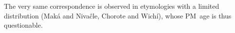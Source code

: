 \begin{exe}
    \ex \honeycomb
    \ex \plaj
    \ex \lick
    \ex \fallonitsown
    \ex \mouth
    \ex \fruit
    \ex \bite
    \ex \companion
    \ex \rightn \label{a-rightn}
    \ex \coal \label{a-coal}
    \ex \disease
    \ex \firef
    \ex \centipede
    \ex \cutdown
    \ex \algarrobof
    \ex \north
    \ex \elbow
    \ex \suncho
    \ex \breath
    \ex \dew \label{a-dew}
    \ex \tooln
    \ex \grove
    \ex \redquebracho \label{a-redquebracho}
    \ex \neighbor
    \ex \elderbro
    \ex \eldersis
    \ex \sunn
    \ex \armadillo \label{a-armadillo}
    \ex \spouse
    \ex \barnowl
    \ex \thorncutjan
    \ex \oldn
    \ex \iscayante \label{a-iscayante}
    \ex \louse
    \ex \daylhuma
    \ex \girl
    \ex \interr
    \ex {}
    \ex \bathe
    \ex \nose
    \ex \newadj \label{a-newadj}
    \ex \snore \label{a-snore}
    \ex \mucus
    \ex \dayworld
    \ex \rain
    \ex \inorderto
    \ex \alienable
    \ex \distrust
    \ex \leg \label{a-leg}
    \ex \fishwithhook
    \ex \starn
    \ex \parakeet
    \ex \wildcat \label{a-wildcat}
    \ex \anteater
    \ex \face \label{a-face}
    \ex \eyebrow \label{a-eyebrow}
    \ex \thunder \label{a-thunder}
    \ex \pseudo \label{a-pseudo}
    \ex \tsofa
    \ex \tsofatajf \label{a-tsofatajf}
    \ex \tsofatajt \label{a-tsofatajt}
    \ex \hornero \label{a-hornero}
    \ex \termitehouse
    \ex \guayacan
    \ex \healthy
    \ex \price
    \ex \night \label{a-night}
    \ex \tuscaf \label{a-tuscaf}
    \ex \tuscat \label{a-tuscat}
    \ex \tuscag
    \ex \caracara
    \ex \earth
    \ex \moon
    \ex \woman
    \ex \ask
    \ex \iguana
    \ex \rat
    \ex \jararaca
    \ex \wildhoney
    \ex \knee \label{a-knee}
    \ex \snakeatuj
    \ex \peccary
    \ex \maguari
    \ex \femalebreast
    \ex \mistolf
    \ex \mistolt
    \ex \wildbean \label{a-wildbean}
    \ex \meat
    \ex \mosquito
    \ex \teach
    \ex \bro
    \ex \puma
    \ex \lessergrison
\end{exe}

The very same correspondence is observed in etymologies with a limited distribution (Maká and Nivaĉle, Chorote and Wichí), whose PM~age is thus questionable.

\begin{exe}
    \ex \brightness
    \ex \dreamv
    \ex \ocelot \label{a-ocelot}
    \ex \lizard
    \ex \heavyv
    \ex \tortoise
    \ex \whitealgarrobof
    \ex \cheek
    \ex \pacu
    \ex \smooth
    \ex \majan
    \ex \heel \label{a-heel}
    \ex \orphancw
    \ex \medicine
    \ex \standv
    \ex \belt
    \ex \yellowv
    \ex \tongue
    \ex \cardon
    \ex \vertical
    \ex \precipice
    \ex \throwcw
    \ex \redbrocket
    \ex \wolf \label{a-wolf}
    \ex \metal
    \ex \balawasp
    \ex \cardinal \label{a-cardinal}
    \ex \stagnant
    \ex \fox
    \ex \saber
    \ex \fatalha
    \ex \cord
    \ex \cebil
    \ex \aloja
    \ex \paralytic \label{a-paralytic}
    \ex \yawn \label{a-yawn}
    \ex \doradocw
    \ex \hiccup \label{a-hiccup}
\end{exe}

